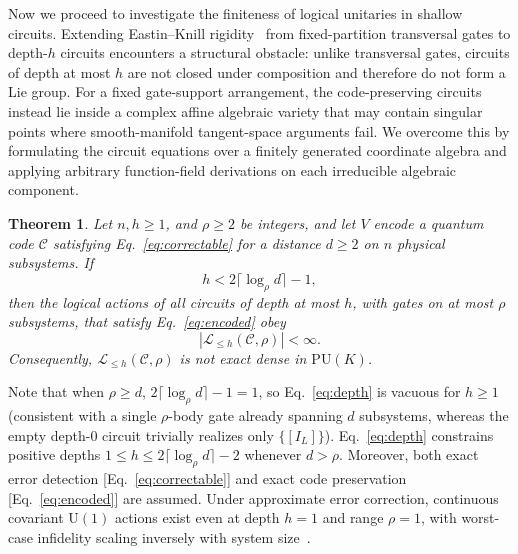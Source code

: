 \documentclass[aps,prl,reprint,notitlepage,nofootinbib,nobibnotes]{revtex4-2}
\newtheorem{theorem}{Theorem}
\newcommand{\UU}{\mathrm U}
\newcommand{\PU}{\mathrm{PU}}
\newcommand{\id}{I}
\begin{document}
 Now we proceed to investigate the finiteness of logical unitaries in shallow circuits. Extending Eastin--Knill rigidity~\cite{EK,Faist,LiuZhou} from fixed-partition transversal gates to depth-$h$ circuits encounters a structural obstacle: unlike transversal gates, circuits of depth at most $h$ are not closed under composition and therefore do not form a Lie group. For a fixed gate-support arrangement, the code-preserving circuits instead lie inside a complex affine algebraic variety that may contain singular points where smooth-manifold tangent-space arguments fail. We overcome this by formulating the circuit equations over a finitely generated coordinate algebra and applying arbitrary function-field derivations on each irreducible algebraic component.
\begin{samepage}
\begin{theorem}\label{thm:depth}
Let $n,h\ge 1$, and $\rho\ge2$ be integers, and let $V$ encode a quantum code $\mathcal C$
satisfying Eq.~\eqref{eq:correctable} for a distance $d\ge2$ on $n$ physical subsystems. If
\begin{equation}\label{eq:depth}
  h<2\lceil\log_{\rho} d\rceil-1,
\end{equation}
then the logical actions of all circuits of depth at most $h$, with gates on at most $\rho$
subsystems, that satisfy Eq.~\eqref{eq:encoded} obey
\[
 |\mathcal L_{\le h}(\mathcal C,\rho)|<\infty.
\]
Consequently, $\mathcal L_{\le h}(\mathcal
C,\rho)$ is not exact dense in $\PU(K)$.
\end{theorem}
\end{samepage}

Note that when $\rho\ge d$, $2\lceil\log_\rho d\rceil-1=1$, so Eq.~\eqref{eq:depth} is vacuous for
$h\ge 1$ (consistent with a single $\rho$-body gate already spanning $d$ subsystems, whereas the
empty depth-$0$ circuit trivially realizes only $\{[\id_L]\}$). Eq.~\eqref{eq:depth} constrains
positive depths $1\le h\le 2\lceil\log_\rho d\rceil-2$ whenever $d>\rho$. Moreover, both exact
error detection [Eq.~\eqref{eq:correctable}] and exact code preservation [Eq.~\eqref{eq:encoded}]
are assumed. Under approximate error correction, continuous covariant $\UU(1)$ actions exist even
at depth $h=1$ and range $\rho=1$, with worst-case infidelity scaling inversely with system
size~\cite{Faist,WoodsAlhambra,KubicaDemkowicz,ZhouLiuJiang,LiuZhou}.
\end{document}
